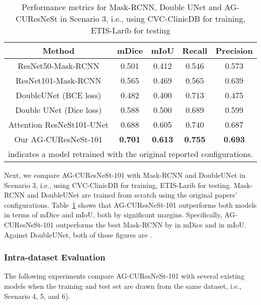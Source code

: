 \documentclass[review, sort&compress]{elsarticle}
\begin{document}
	\begin{table}
		\centering
		\caption{Performance metrics for Mask-RCNN, Double UNet and AG-CUResNeSt in Scenario 3, i.e., using CVC-ClinicDB for training, ETIS-Larib for testing}
		\begin{tabular}{c|c c c c}
			\hline
			Method & mDice  & mIoU  & Recall  & Precision   \\
			\hline
			\hline
			ResNet50-Mask-RCNN \cite{qadir2019polyp}      & 0.501   & 0.412         & 0.546  & 0.573      \\
			
			ResNet101-Mask-RCNN \cite{qadir2019polyp}     & 0.565   & 0.469         & 0.565  & 0.639      \\
			
			DoubleUNet (BCE loss) \cite{jha2020doubleu}  & 0.482   & 0.400         & 0.713  & 0.475      \\
			
			Double UNet (Dice loss) \cite{jha2020doubleu}  & 0.588   & 0.500         & 0.689  & 0.599      \\
			\hline
			\hline
			Attention ResNeSt101-UNet     & 0.688   & 0.605         & 0.740  & 0.687      \\
			
			Our AG-CUResNeSt-101       & \textbf{0.701}  & \textbf{0.613}         & \textbf{0.755}  & \textbf{0.693}      \\
			\hline
			\multicolumn{5}{l}{ indicates a model retrained with the original reported configurations.
			}
		\end{tabular}
		\label{tab_clinic_etis}
	\end{table}
	
	Next, we compare AG-CUResNeSt-101 with Mask-RCNN and DoubleUNet in Scenario 3, i.e., using CVC-ClinicDB for training, ETIS-Larib for testing. Mask-RCNN \cite{qadir2019polyp} and DoubleUNet \cite{jha2020doubleu} are trained from scratch using the original papers' configurations. Table~\ref{tab_clinic_etis} shows that AG-CUResNeSt-101 outperforms both models in terms of mDice and mIoU, both by significant margins. Specifically, AG-CUResNeSt-101 outperforms the best Mask-RCNN by  in mDice and  in mIoU. Against DoubleUNet, both of these figures are .
	
	\subsubsection{Intra-dataset Evaluation}
	The following experiments compare AG-CUResNeSt-101 with several existing models when the training and test set are drawn from the same dataset, i.e., Scenario 4, 5, and 6).
	
\end{document}
